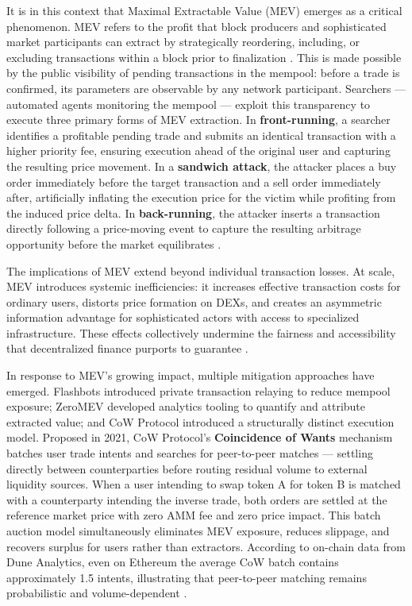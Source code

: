 It is in this context that Maximal Extractable Value (MEV) emerges as a critical phenomenon. MEV refers to the profit that block producers and sophisticated market participants can extract by strategically reordering, including, or excluding transactions within a block prior to finalization \cite{WhatMaximalExtractable}. This is made possible by the public visibility of pending transactions in the mempool: before a trade is confirmed, its parameters are observable by any network participant. Searchers — automated agents monitoring the mempool — exploit this transparency to execute three primary forms of MEV extraction. In \textbf{front-running}, a searcher identifies a profitable pending trade and submits an identical transaction with a higher priority fee, ensuring execution ahead of the original user and capturing the resulting price movement. In a \textbf{sandwich attack}, the attacker places a buy order immediately before the target transaction and a sell order immediately after, artificially inflating the execution price for the victim while profiting from the induced price delta. In \textbf{back-running}, the attacker inserts a transaction directly following a price-moving event to capture the resulting arbitrage opportunity before the market equilibrates \cite{WhatMaximalExtractable}.

The implications of MEV extend beyond individual transaction losses. At scale, MEV introduces systemic inefficiencies: it increases effective transaction costs for ordinary users, distorts price formation on DEXs, and creates an asymmetric information advantage for sophisticated actors with access to specialized infrastructure. These effects collectively undermine the fairness and accessibility that decentralized finance purports to guarantee \cite{WhatMaximalExtractable}.

In response to MEV's growing impact, multiple mitigation approaches have emerged. Flashbots introduced private transaction relaying to reduce mempool exposure; ZeroMEV developed analytics tooling to quantify and attribute extracted value; and CoW Protocol introduced a structurally distinct execution model. Proposed in 2021, CoW Protocol's \textbf{Coincidence of Wants} mechanism batches user trade intents and searches for peer-to-peer matches — settling directly between counterparties before routing residual volume to external liquidity sources. When a user intending to swap token A for token B is matched with a counterparty intending the inverse trade, both orders are settled at the reference market price with zero AMM fee and zero price impact. This batch auction model simultaneously eliminates MEV exposure, reduces slippage, and recovers surplus for users rather than extractors. According to on-chain data from Dune Analytics, even on Ethereum the average CoW batch contains approximately 1.5 intents, illustrating that peer-to-peer matching remains probabilistic and volume-dependent \cite{BatchHistoryDune2023}.


